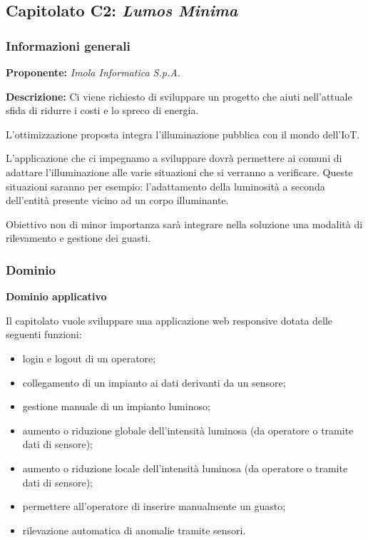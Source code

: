 \subsection{Capitolato C2: \textit{Lumos Minima}}
\subsubsection{Informazioni generali}
\textbf{Proponente:} \textit{Imola Informatica S.p.A.}

\textbf{Descrizione:} Ci viene richiesto di sviluppare un progetto che aiuti nell'attuale sfida di ridurre i costi e lo spreco di energia.

L'ottimizzazione proposta integra l'illuminazione pubblica con il mondo dell'IoT.

L'applicazione che ci impegnamo a sviluppare dovrà permettere ai comuni di adattare l'illuminazione alle varie situazioni che si verranno a verificare. Queste situazioni saranno per esempio: l'adattamento della luminosità a seconda dell'entità presente vicino ad un corpo illuminante.

Obiettivo non di minor importanza sarà integrare nella soluzione una modalità di rilevamento e gestione dei guasti. 

\subsubsection{Dominio}

\textbf{Dominio applicativo}

Il capitolato vuole sviluppare una applicazione web responsive dotata delle seguenti funzioni:
\begin{itemize}
    \item login e logout di un operatore;
    \item collegamento di un impianto ai dati derivanti da un sensore;
    \item gestione manuale di un impianto luminoso;
    \item aumento o riduzione globale dell'intensità luminosa (da operatore o tramite dati di sensore);
    \item aumento o riduzione locale dell'intensità luminosa (da operatore o tramite dati di sensore);
    \item permettere all'operatore di inserire manualmente un guasto;
    \item rilevazione automatica di anomalie tramite sensori.
\end{itemize}

